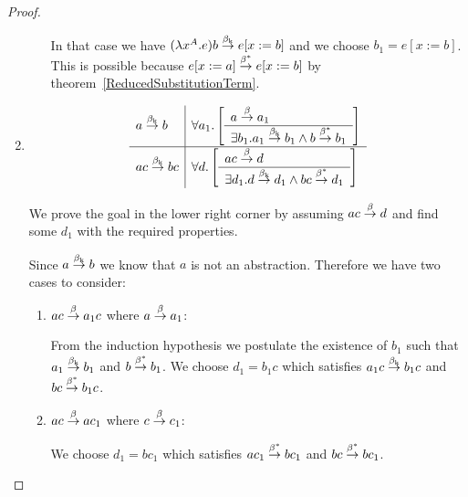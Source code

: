 \begin{theorem}
\begin{proof}
\begin{enumerate}
\begin{enumerate}
                        In that case we have $(\lambda x^A.e)b \stackrel{\beta_{\text{k}}}{\to}
                        e[x:=b]$ and we choose $b_1 = e[x:=b]$. This is possible
                        because $e[x:=a] \stackrel{\beta^*}{\to} e[x:=b]$ by
                        theorem~\ref{ReducedSubstitutionTerm}.
                \end{enumerate}

            \item
                $$
                \begin{array}{l|l}
                    a \stackrel{\beta_{\text{k}}}{\to} b
                    &
                    \forall a_1. \left[ \begin{array}{l} a \stackrel{\beta}{\to} a_1 \\ \hline 
                        \exists b_1. a_1 \stackrel{\beta_{\text{k}}}{\to} b_1 \land b \stackrel{\beta^*}{\to} b_1
                    \end{array} \right]
                    \\
                    \hline
                    ac \stackrel{\beta_{\text{k}}}{\to} bc
                    &
                    \forall d. \left[ \begin{array}{l} ac \stackrel{\beta}{\to} d \\ \hline 
                        \exists d_1. d \stackrel{\beta_{\text{k}}}{\to} d_1 \land bc \stackrel{\beta^*}{\to} d_1
                    \end{array} \right]
                \end{array}
                $$

                We prove the goal in the lower right corner by assuming $ac
                \stackrel{\beta}{\to} d$ and find some $d_1$ with the required properties.

                Since $a \stackrel{\beta_{\text{k}}}{\to} b$ we know that $a$ is not an abstraction.
                Therefore we have two cases to consider:
                \begin{enumerate}
                    \item $ac \stackrel{\beta}{\to} a_1 c$ where $a \stackrel{\beta}{\to} a_1$:

                        From the induction hypothesis we postulate the existence
                        of $b_1$ such that $a_1 \stackrel{\beta_{\text{k}}}{\to} b_1$ and $b
                        \stackrel{\beta^*}{\to} b_1$. We choose $d_1 = b_1 c$ which
                        satisfies $a_1 c \stackrel{\beta_{\text{k}}}{\to} b_1 c$ and $bc \stackrel{\beta^*}{\to}
                        b_1 c$.

                    \item $ac \stackrel{\beta}{\to} a c_1$ where $c \stackrel{\beta}{\to} c_1$:

                        We choose $d_1 = b c_1$ which satisfies $a c_1
                        \stackrel{\beta^*}{\to} b c_1$ and $b c \stackrel{\beta^*}{\to} b c_1$.
                \end{enumerate}
        \end{enumerate}
    \end{proof}
\end{theorem}





